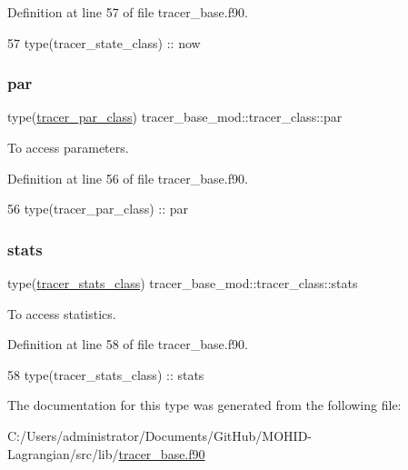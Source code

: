 Definition at line 57 of file tracer\+\_\+base.\+f90.


\begin{DoxyCode}
57         \textcolor{keywordtype}{type}(tracer\_state\_class) :: now
\end{DoxyCode}
\mbox{\label{structtracer__base__mod_1_1tracer__class_abadf1c607905330dc05f8985f6487a41}} 
\subsubsection{\texorpdfstring{par}{par}}
{\footnotesize\ttfamily type(\mbox{\hyperlink{structtracer__base__mod_1_1tracer__par__class}{tracer\+\_\+par\+\_\+class}}) tracer\+\_\+base\+\_\+mod\+::tracer\+\_\+class\+::par\hspace{0.3cm}{\ttfamily [private]}}



To access parameters. 



Definition at line 56 of file tracer\+\_\+base.\+f90.


\begin{DoxyCode}
56         \textcolor{keywordtype}{type}(tracer\_par\_class)   :: par
\end{DoxyCode}
\mbox{\label{structtracer__base__mod_1_1tracer__class_a688d74f9059a50eba8fdd536c2f79876}} 
\subsubsection{\texorpdfstring{stats}{stats}}
{\footnotesize\ttfamily type(\mbox{\hyperlink{structtracer__base__mod_1_1tracer__stats__class}{tracer\+\_\+stats\+\_\+class}}) tracer\+\_\+base\+\_\+mod\+::tracer\+\_\+class\+::stats\hspace{0.3cm}{\ttfamily [private]}}



To access statistics. 



Definition at line 58 of file tracer\+\_\+base.\+f90.


\begin{DoxyCode}
58         \textcolor{keywordtype}{type}(tracer\_stats\_class) :: stats
\end{DoxyCode}


The documentation for this type was generated from the following file\+:\begin{DoxyCompactItemize}
\item 
C\+:/\+Users/administrator/\+Documents/\+Git\+Hub/\+M\+O\+H\+I\+D-\/\+Lagrangian/src/lib/\mbox{\hyperlink{tracer__base_8f90}{tracer\+\_\+base.\+f90}}\end{DoxyCompactItemize}
